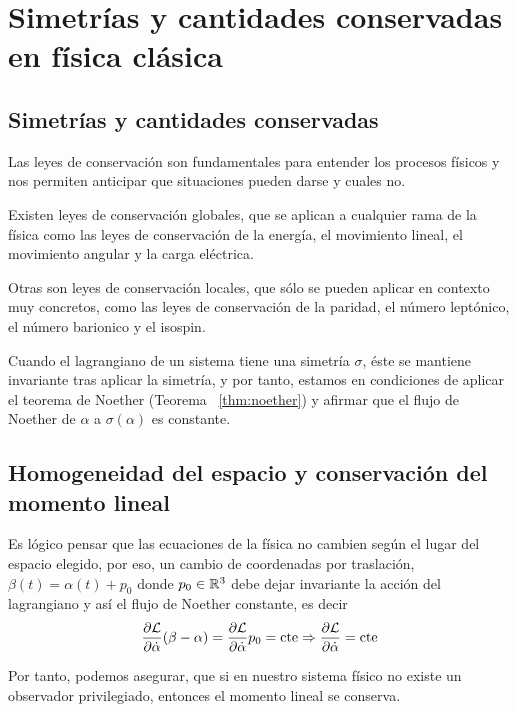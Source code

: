\chapter{Simetrías y cantidades conservadas en física clásica}\label{ch:simetrias-y-cantidades-conservadas-en-fisica-clasica}

\section{Simetrías y cantidades conservadas}\label{sec:simetrias-y-cantidades-conservadas}

Las leyes de conservación son fundamentales para entender los procesos físicos y nos permiten anticipar que situaciones pueden darse y cuales no.

Existen leyes de conservación globales, que se aplican a cualquier rama de la física como las leyes de conservación de la energía, el movimiento lineal, el movimiento angular y la carga eléctrica.

Otras son leyes de conservación locales, que sólo se pueden aplicar en contexto muy concretos, como las leyes de conservación de la paridad, el número leptónico, el número barionico y el isospin.

Cuando el lagrangiano de un sistema tiene una simetría $\sigma$, éste se mantiene invariante tras aplicar la simetría, y por tanto, estamos en condiciones de aplicar el teorema de Noether (Teorema ~\eqref{thm:noether}) y afirmar que el flujo de Noether de $\alpha$ a $\sigma(\alpha)$ es constante.

\section{Homogeneidad del espacio y conservación del momento lineal}\label{sec:homogeneidad-del-espacio-y-conservacion-del-momento-lineal}
Es lógico pensar que las ecuaciones de la física no cambien según el lugar del espacio elegido, por eso, un cambio de coordenadas por traslación, $\beta(t)=\alpha(t)+p_0$ donde $p_0\in\mathbb{R}^3$ debe dejar invariante la acción del lagrangiano y así el flujo de Noether constante, es decir
\begin{equation}
	\label{eq:conservacion_momento_lineal}
	\frac{\partial \mathcal{L}}{\partial\dot{\alpha}}(\beta-\alpha) = \frac{\partial \mathcal{L}}{\partial\dot{\alpha}}p_0=\text{cte}\Rightarrow\frac{\partial \mathcal{L}}{\partial\dot{\alpha}}=\text{cte}
\end{equation}

Por tanto, podemos asegurar, que si en nuestro sistema físico no existe un observador privilegiado, entonces el momento lineal se conserva.

